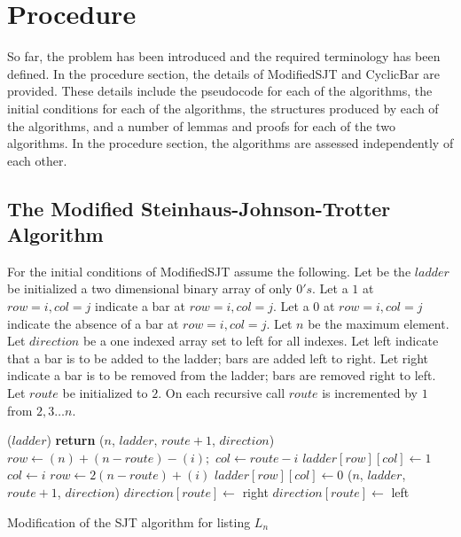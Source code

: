 

\section{Procedure}

So far, the problem has been introduced and the required terminology has been defined. In the procedure section,
 the details of {\sc ModifiedSJT} and {\sc CyclicBar} are provided. These details include the pseudocode for 
 each of the algorithms, the initial conditions for each of the algorithms, the structures produced by each 
 of the algorithms, and a number of lemmas and proofs for each of the two algorithms. In the procedure section, 
 the algorithms are assessed independently of each other.
\subsection{The Modified Steinhaus-Johnson-Trotter Algorithm}

For the initial conditions of {\sc ModifiedSJT} assume the following. 
Let be the $ladder$ be initialized a two dimensional binary array of only $0's$.
 Let a $1$ at $row=i,col=j$ 
indicate a bar at  $row=i,col=j$. Let a $0$ at $row=i,col=j$ 
indicate the absence of a bar at  $row=i,col=j$.
Let $n$ be the maximum element. Let $direction$ be a one 
indexed array set to left for all indexes. Let left indicate that a bar is to be added to the ladder; bars 
are added left to right. Let right indicate a bar is to be removed from the ladder; bars 
are removed right to left. Let $route$ be initialized to $2$. On each recursive call 
$route$ is incremented by $1$ from $2,3 \dots n$.
\begin{algorithm}
  \begin{algorithmic}[1]
        ($ladder$)
        \State \textbf{return}
      \EndIf
          ($n$, $ladder$, $route+1$, $direction$)
        \Else 
            \State $row \gets (n) + (n - route) - (i);$
            \State $col \gets route - i$
            \State $ladder[row][col] \gets 1$
          \Else
            \State $col \gets i$
            \State $row \gets 2(n - route) + (i)$
            \State $ladder[row][col] \gets 0$
          \EndIf
        \EndIf
        ($n$, $ladder$, $route+1$, $direction$)
      \EndFor
        \State $direction[route] \gets$ right
      \Else
        \State $direction[route] \gets$ left
      \EndIf
    \EndFunction
  \end{algorithmic}
  \caption{Modification of the {\sc SJT} algorithm for listing $L_{n}$}
  \label{Alg:ModSJT}
\end{algorithm}


